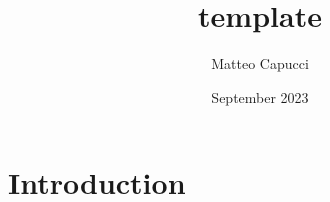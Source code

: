 \documentclass{article}
\title{template}
\author{Matteo Capucci}
\date{September 2023}
\begin{document}
\maketitle

\section{Introduction}
\end{document}
